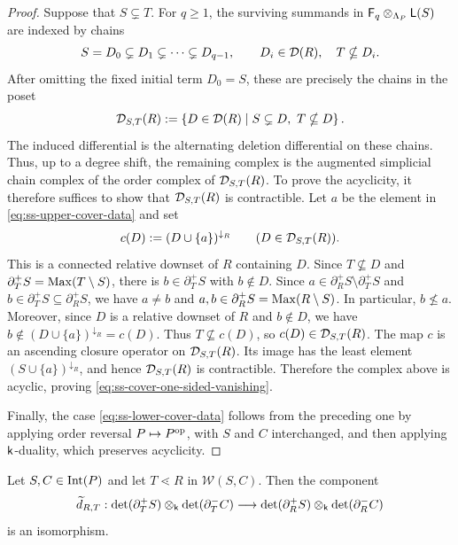 \begin{proof}
Suppose that $S\subsetneq T$.  For $q\geq1$, the surviving summands in
$\mathsf F_q\otimes_{\Lambda_P}\mathsf L(S)$ are indexed by chains
\[
S=D_0\subsetneq D_1\subsetneq\cdots\subsetneq D_{q-1},
\qquad
D_i\in\mathcal D(R),\quad T\nsubseteq D_i.
\]
After omitting the fixed initial term $D_0=S$, these are precisely the
chains in the poset
\[
\mathcal D_{S,T}(R)
:=
\left\{
D\in\mathcal D(R)
\mid
S\subsetneq D,\ T\nsubseteq D
\right\}.
\]
The induced differential is the alternating deletion differential on
these chains.  
Thus, up to a degree shift, the remaining complex is the augmented
simplicial chain complex of the order complex of $\mathcal D_{S,T}(R)$. 
To prove the acyclicity, it therefore suffices to show that
$\mathcal D_{S,T}(R)$ is contractible.
Let $a$ be the element in \eqref{eq:ss-upper-cover-data} and set  
\[
c(D):=(D\cup\{a\})^{\downarrow_R}
\qquad
(D\in\mathcal D_{S,T}(R)).
\]
This is a connected relative downset of $R$ containing $D$.
Since $T\nsubseteq D$ and
$\partial_T^+S=\operatorname{Max}(T\setminus S)$, there is
$b\in\partial_T^+S$ with $b\notin D$. 
Since
$a\in\partial_R^+S\setminus\partial_T^+S$
and $b\in\partial_T^+S\subseteq\partial_R^+S$, we have
$a\neq b$ and
$a,b\in\partial_R^+S=\operatorname{Max}(R\setminus S)$.
In particular, $b\nleq a$.
Moreover, since $D$ is a relative downset of $R$ and $b\notin D$,
we have $b\notin(D\cup\{a\})^{\downarrow_R}=c(D)$.
Thus $T\nsubseteq c(D)$, so $c(D)\in\mathcal D_{S,T}(R)$.
The map $c$ is an ascending closure operator on $\mathcal D_{S,T}(R)$.
Its image has the least element $(S\cup\{a\})^{\downarrow_R}$, and
hence $\mathcal D_{S,T}(R)$ is contractible.
Therefore the complex above is acyclic, proving
\eqref{eq:ss-cover-one-sided-vanishing}.

Finally, the case \eqref{eq:ss-lower-cover-data} follows from the
preceding one by applying order reversal $P\mapsto P^{\mathrm{op}}$, with
$S$ and $C$ interchanged, and then applying $\mathsf{k}$-duality, which
preserves acyclicity.
\end{proof}



\begin{proposition}
\label{prop:ss-cover-component}
Let $S,C\in\operatorname{Int}(P)$ and let $T\lessdot R$ in
$\mathcal W(S,C)$.  Then the component
\[
\widetilde d_{R,T}:
\det(\partial_T^+S)\otimes_{\mathsf{k}}\det(\partial_T^-C)
\longrightarrow
\det(\partial_R^+S)\otimes_{\mathsf{k}}\det(\partial_R^-C)
\]
is an isomorphism.
\end{proposition}

